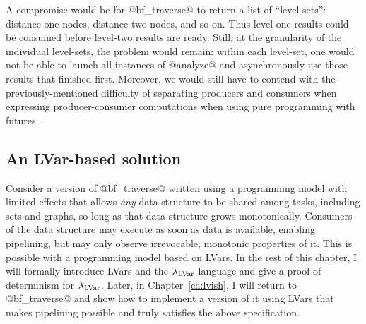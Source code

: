A compromise would be for @bf_traverse@ to return a list of
``level-sets'': distance one nodes, distance two nodes, and so on.
Thus level-one results could be consumed before level-two results are
ready.  Still, at the granularity of the individual level-sets, the
problem would remain: within each level-set, one would not be able to
launch all instances of @analyze@ and asynchronously use those results
that finished first.  Moreover, we would still have to contend with
the previously-mentioned difficulty of separating producers and
consumers when expressing producer-consumer computations when using
pure programming with futures~\cite{monad-par}.

\subsection{An LVar-based solution}

Consider a version of @bf_traverse@ written using a programming model
with limited effects that allows \emph{any} data structure to be
shared among tasks, including sets and graphs, so long as that data
structure grows monotonically.  Consumers of the data structure may
execute as soon as data is available, enabling pipelining, but may
only observe irrevocable, monotonic properties of it. This is possible
with a programming model based on LVars.  In the rest of this chapter,
I will formally introduce LVars and the $\lambda_{\textrm{LVar}}$ language and
give a proof of determinism for $\lambda_{\textrm{LVar}}$.  Later, in
Chapter~\ref{ch:lvish}, I will return to @bf_traverse@ and show how to
implement a version of it using LVars that makes pipelining possible
and truly satisfies the above specification.
